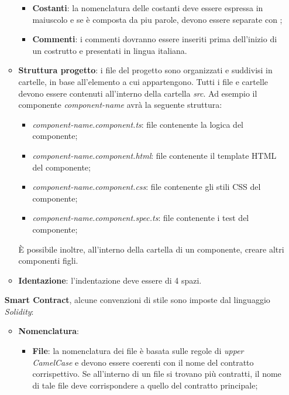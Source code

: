 \begin{itemize}
\begin{itemize}
\begin{itemize}
            \item \textbf{Costanti}: la nomenclatura delle costanti deve essere espressa in maiuscolo e se è composta da piu parole, devono essere separate con \textit{\textunderscore};
            \item \textbf{Commenti}: i commenti dovranno essere inseriti prima dell’inizio di un  costrutto e presentati in
            lingua italiana.
        \end{itemize}
        \item \textbf{Struttura progetto}: i file del progetto sono organizzati e suddivisi in cartelle, in base all'elemento a cui appartengono. \newline
        Tutti i file e cartelle devono essere contenuti all'interno della cartella \textit{src}. \newline
        Ad esempio il componente \textit{component-name} avrà la seguente struttura:
        \begin{itemize}
            \item \textit{component-name.component.ts}: file contenente la logica del componente;
            \item \textit{component-name.component.html}: file contenente il template HTML del componente;
            \item \textit{component-name.component.css}: file contenente gli stili CSS del componente;
            \item \textit{component-name.component.spec.ts}: file contenente i test del componente;
        \end{itemize}
        È possibile inoltre, all'interno della cartella di un componente, creare altri componenti figli.
        \item \textbf{Identazione}: l'indentazione deve essere di 4 spazi.
    \end{itemize}
    \textbf{Smart Contract}, alcune convenzioni di stile sono imposte dal linguaggio \textit{Solidity}:
    \begin{itemize}
        \item \textbf{Nomenclatura}:
        \begin{itemize}
            \item \textbf{File}: la nomenclatura dei file è basata sulle regole di \textit{upper CamelCase} e devono essere coerenti con il nome del contratto corrispettivo. \newline
            Se all'interno di un file si trovano più contratti, il nome di tale file deve corrispondere a quello del contratto principale;

\end{itemize}
\end{itemize}
\end{itemize}
